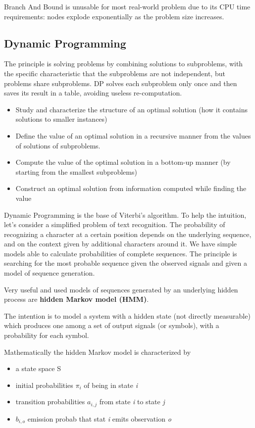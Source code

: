 \documentclass[11pt]{article}
\begin{document}
Branch And Bound is unusable for most real-world problem due to its CPU time requirements: nodes explode exponentially as the problem size increases.

\subsection{Dynamic Programming}
The principle is solving problems by combining solutions to subproblems, with the specific characteristic that the subproblems are not independent, but problems share subproblems. DP solves each subproblem only once and then saves its result in a table, avoiding useless re-computation.

\begin{itemize}
\item Study and characterize the structure of an optimal solution (how it contains solutions to smaller instances)
\item Define the value of an optimal solution in a recursive manner from the values of solutions of subproblems.
\item Compute the value of the optimal solution in a bottom-up manner (by starting from the smallest subproblems)
\item Construct an optimal solution from information computed while finding the value
\end{itemize}

Dynamic Programming is the base of Viterbi's algorithm. To help the intuition, let’s consider a simplified problem of text recognition.
The probability of recognizing a character at a certain position depends on the underlying sequence, and on the context given by additional characters around it. 
We have simple models able to calculate probabilities of complete sequences. The principle is searching for the most probable sequence given the observed signals and given a model of sequence generation.

Very useful and used models of sequences generated by an underlying hidden process are \textbf{hidden Markov model (HMM)}.

The intention is to model a system with a hidden state (not directly measurable) which produces one among a set of output signals (or symbols), with a probability for each symbol. 

Mathematically the hidden Markov model is characterized by 
\begin{itemize}
\item a state space S
\item initial probabilities $ \pi_i $  of being in state \textit{i}
\item transition probabilities $ a_{i,j} $ from state \textit{i} to state \textit{j}
\item $ b_{i,o} $ emission probab that stat \textit{i} emits observation \textit{o}
\end{itemize}
\end{document}

